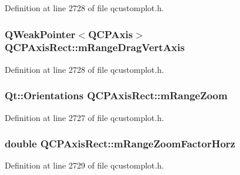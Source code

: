 Definition at line 2728 of file qcustomplot.\-h.

\hypertarget{class_q_c_p_axis_rect_a50a38866ae73cbec970ef89550d4df7b}{
\subsubsection[{m\-Range\-Drag\-Vert\-Axis}]{\setlength{\rightskip}{0pt plus 5cm}Q\-Weak\-Pointer$<${\bf Q\-C\-P\-Axis}$>$ Q\-C\-P\-Axis\-Rect\-::m\-Range\-Drag\-Vert\-Axis\hspace{0.3cm}{\ttfamily [protected]}}}\label{class_q_c_p_axis_rect_a50a38866ae73cbec970ef89550d4df7b}


Definition at line 2728 of file qcustomplot.\-h.

\hypertarget{class_q_c_p_axis_rect_a215eff671d48df2edccc36e7f976f28c}{
\subsubsection[{m\-Range\-Zoom}]{\setlength{\rightskip}{0pt plus 5cm}Qt\-::\-Orientations Q\-C\-P\-Axis\-Rect\-::m\-Range\-Zoom\hspace{0.3cm}{\ttfamily [protected]}}}\label{class_q_c_p_axis_rect_a215eff671d48df2edccc36e7f976f28c}


Definition at line 2727 of file qcustomplot.\-h.

\hypertarget{class_q_c_p_axis_rect_ad08d0250ed7b99de387d0ea6c7fd4dc1}{
\subsubsection[{m\-Range\-Zoom\-Factor\-Horz}]{\setlength{\rightskip}{0pt plus 5cm}double Q\-C\-P\-Axis\-Rect\-::m\-Range\-Zoom\-Factor\-Horz\hspace{0.3cm}{\ttfamily [protected]}}}\label{class_q_c_p_axis_rect_ad08d0250ed7b99de387d0ea6c7fd4dc1}


Definition at line 2729 of file qcustomplot.\-h.

